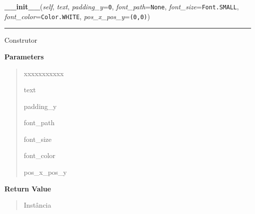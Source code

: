     \label{pygame-asteroids:menu_helper:MenuItem:__init__}

    \vspace{0.5ex}

\hspace{.8\funcindent}\begin{boxedminipage}{\funcwidth}

    \raggedright \textbf{\_\_init\_\_}(\textit{self}, \textit{text}, \textit{padding\_y}={\tt 0}, \textit{font\_path}={\tt None}, \textit{font\_size}={\tt Font.SMALL}, \textit{font\_color}={\tt Color.WHITE}, \textit{pos\_x\_pos\_y}={\tt (0,0)})

    \vspace{-1.5ex}

    \rule{\textwidth}{0.5\fboxrule}
\setlength{\parskip}{2ex}
    Construtor

\setlength{\parskip}{1ex}
      \textbf{Parameters}
      \vspace{-1ex}

      \begin{quote}
        \begin{Ventry}{xxxxxxxxxxx}

          \item[text]

          \item[padding\_y]

          \item[font\_path]

          \item[font\_size]

          \item[font\_color]

          \item[pos\_x\_pos\_y]

        \end{Ventry}

      \end{quote}

      \textbf{Return Value}
    \vspace{-1ex}

      \begin{quote}
      Instância

      \end{quote}

    \end{boxedminipage}


